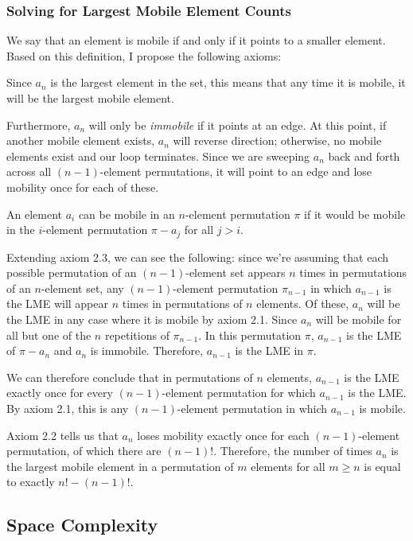 \documentclass[10pt, oneside]{article}   	%
\begin{document}
\subsubsection{Solving for Largest Mobile Element Counts}

We say that an element is mobile if and only if it points to a smaller element. Based on this definition, I propose the following axioms:
\begin{axiom}
	Since $a_{n}$ is the largest element in the set, this means that any time it is mobile, it will be the largest mobile element.
\end{axiom}
\begin{axiom}
	Furthermore, $a_{n}$ will only be \emph{immobile} if it points at an edge. At this point, if another mobile element exists, $a_{n}$ will reverse direction; otherwise, no mobile elements exist and our loop terminates. Since we are sweeping $a_{n}$ back and forth across all $(n - 1)$-element permutations, it will point to an edge and lose mobility once for each of these.
\end{axiom}
\begin{axiom}
	An element $a_{i}$ can be mobile in an $n$-element permutation $\pi$ if it would be mobile in the $i$-element permutation $\pi - a_{j}$ for all $j > i$.
\end{axiom}
Extending axiom 2.3, we can see the following: since we're assuming that each possible permutation of an $(n - 1)$-element set appears $n$ times in permutations of an $n$-element set, any $(n - 1)$-element permutation $\pi_{n - 1}$ in which $a_{n - 1}$ is the LME will appear $n$ times in permutations of $n$ elements. Of these, $a_{n}$ will be the LME in any case where it is mobile by axiom 2.1. Since $a_{n}$ will be mobile for all but one of the $n$ repetitions of $\pi_{n - 1}$. In this permutation $\pi$, $a_{n - 1}$ is the LME of $\pi - a_{n}$ and $a_{n}$ is immobile. Therefore, $a_{n - 1}$ is the LME in $\pi$.

We can therefore conclude that in permutations of $n$ elements, $a_{n - 1}$ is the LME exactly once for every $(n - 1)$-element permutation for which $a_{n - 1}$ is the LME. By axiom 2.1, this is any $(n - 1)$-element permutation in which $a_{n - 1}$ is mobile.

Axiom 2.2 tells us that $a_{n}$ loses mobility exactly once for each $(n - 1)$-element permutation, of which there are $(n - 1)!$. Therefore, the number of times $a_{n}$ is the largest mobile element in a permutation of $m$ elements for all $m \geq n$ is equal to exactly $n! - (n - 1)!$.

\subsection{Space Complexity}
\end{document}
